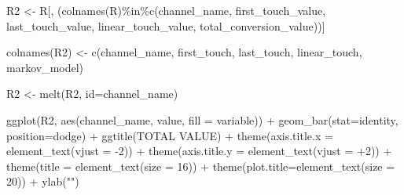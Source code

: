 \documentclass[
]{book}
\newenvironment{Shaded}{\begin{snugshade}}{\end{snugshade}}
\newcommand{\AttributeTok}[1]{\textcolor[rgb]{0.77,0.63,0.00}{#1}}
\newcommand{\DecValTok}[1]{\textcolor[rgb]{0.00,0.00,0.81}{#1}}
\newcommand{\FunctionTok}[1]{\textcolor[rgb]{0.00,0.00,0.00}{#1}}
\newcommand{\NormalTok}[1]{#1}
\newcommand{\OtherTok}[1]{\textcolor[rgb]{0.56,0.35,0.01}{#1}}
\newcommand{\SpecialCharTok}[1]{\textcolor[rgb]{0.00,0.00,0.00}{#1}}
\newcommand{\StringTok}[1]{\textcolor[rgb]{0.31,0.60,0.02}{#1}}
\begin{document}
\begin{Shaded}
\begin{Highlighting}[]
\NormalTok{R2 }\OtherTok{\textless{}{-}}\NormalTok{ R[, (}\FunctionTok{colnames}\NormalTok{(R)}\SpecialCharTok{\%in\%}\FunctionTok{c}\NormalTok{(}\StringTok{\textquotesingle{}channel\_name\textquotesingle{}}\NormalTok{, }\StringTok{\textquotesingle{}first\_touch\_value\textquotesingle{}}\NormalTok{, }\StringTok{\textquotesingle{}last\_touch\_value\textquotesingle{}}\NormalTok{, }\StringTok{\textquotesingle{}linear\_touch\_value\textquotesingle{}}\NormalTok{, }\StringTok{\textquotesingle{}total\_conversion\_value\textquotesingle{}}\NormalTok{))]}

\FunctionTok{colnames}\NormalTok{(R2) }\OtherTok{\textless{}{-}} \FunctionTok{c}\NormalTok{(}\StringTok{\textquotesingle{}channel\_name\textquotesingle{}}\NormalTok{, }\StringTok{\textquotesingle{}first\_touch\textquotesingle{}}\NormalTok{, }\StringTok{\textquotesingle{}last\_touch\textquotesingle{}}\NormalTok{, }\StringTok{\textquotesingle{}linear\_touch\textquotesingle{}}\NormalTok{, }\StringTok{\textquotesingle{}markov\_model\textquotesingle{}}\NormalTok{)}

\NormalTok{R2 }\OtherTok{\textless{}{-}} \FunctionTok{melt}\NormalTok{(R2, }\AttributeTok{id=}\StringTok{\textquotesingle{}channel\_name\textquotesingle{}}\NormalTok{)}

\FunctionTok{ggplot}\NormalTok{(R2, }\FunctionTok{aes}\NormalTok{(channel\_name, value, }\AttributeTok{fill =}\NormalTok{ variable)) }\SpecialCharTok{+}
  \FunctionTok{geom\_bar}\NormalTok{(}\AttributeTok{stat=}\StringTok{\textquotesingle{}identity\textquotesingle{}}\NormalTok{, }\AttributeTok{position=}\StringTok{\textquotesingle{}dodge\textquotesingle{}}\NormalTok{) }\SpecialCharTok{+}
  \FunctionTok{ggtitle}\NormalTok{(}\StringTok{\textquotesingle{}TOTAL VALUE\textquotesingle{}}\NormalTok{) }\SpecialCharTok{+} 
  \FunctionTok{theme}\NormalTok{(}\AttributeTok{axis.title.x =} \FunctionTok{element\_text}\NormalTok{(}\AttributeTok{vjust =} \SpecialCharTok{{-}}\DecValTok{2}\NormalTok{)) }\SpecialCharTok{+}
  \FunctionTok{theme}\NormalTok{(}\AttributeTok{axis.title.y =} \FunctionTok{element\_text}\NormalTok{(}\AttributeTok{vjust =} \SpecialCharTok{+}\DecValTok{2}\NormalTok{)) }\SpecialCharTok{+}
  \FunctionTok{theme}\NormalTok{(}\AttributeTok{title =} \FunctionTok{element\_text}\NormalTok{(}\AttributeTok{size =} \DecValTok{16}\NormalTok{)) }\SpecialCharTok{+}
  \FunctionTok{theme}\NormalTok{(}\AttributeTok{plot.title=}\FunctionTok{element\_text}\NormalTok{(}\AttributeTok{size =} \DecValTok{20}\NormalTok{)) }\SpecialCharTok{+}
  \FunctionTok{ylab}\NormalTok{(}\StringTok{""}\NormalTok{)}
\end{Highlighting}
\end{Shaded}
\end{document}

